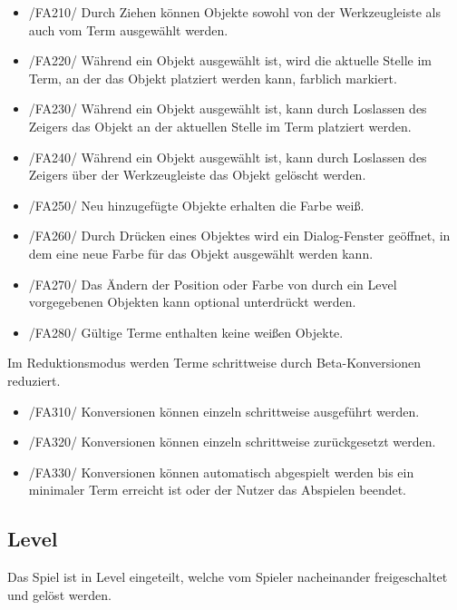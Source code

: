 \begin{itemize}
\item /FA210/ Durch Ziehen können Objekte sowohl von der Werkzeugleiste als auch vom Term ausgewählt werden.
\item /FA220/ Während ein Objekt ausgewählt ist, wird die aktuelle Stelle im Term, an der das Objekt platziert werden kann, farblich markiert.
\item /FA230/ Während ein Objekt ausgewählt ist, kann durch Loslassen des Zeigers das Objekt an der aktuellen Stelle im Term platziert werden.
\item /FA240/ Während ein Objekt ausgewählt ist, kann durch Loslassen des Zeigers über der Werkzeugleiste das Objekt gelöscht werden.
\item /FA250/ Neu hinzugefügte Objekte erhalten die Farbe weiß.
\item /FA260/ Durch Drücken eines Objektes wird ein Dialog-Fenster geöffnet, in dem eine neue Farbe für das Objekt ausgewählt werden kann.
\item /FA270/ Das Ändern der Position oder Farbe von durch ein Level vorgegebenen Objekten kann optional unterdrückt werden.
\item /FA280/ Gültige Terme enthalten keine weißen Objekte.
\end{itemize}

Im Reduktionsmodus werden Terme schrittweise durch Beta-Konversionen reduziert.

\begin{itemize}
\item /FA310/ Konversionen können einzeln schrittweise ausgeführt werden.
\item /FA320/ Konversionen können einzeln schrittweise zurückgesetzt werden.
\item /FA330/ Konversionen können automatisch abgespielt werden bis ein minimaler Term erreicht ist oder der Nutzer das Abspielen beendet.
\end{itemize}

\subsection{Level}

Das Spiel ist in Level eingeteilt, welche vom Spieler nacheinander freigeschaltet und gelöst werden.

